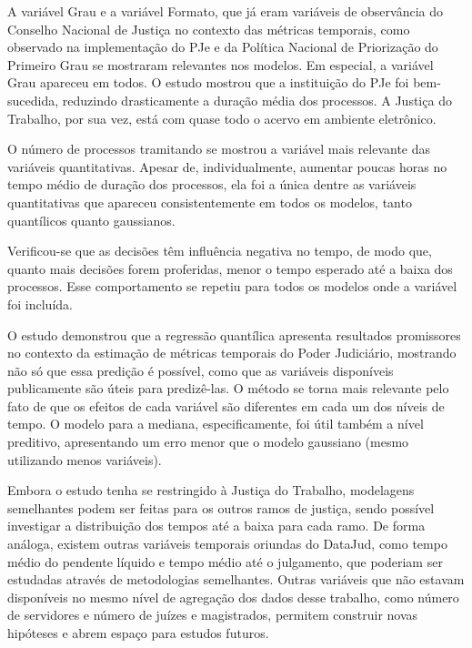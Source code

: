 
A variável Grau e a variável Formato, que já eram variáveis de observância do Conselho Nacional de Justiça no contexto das métricas temporais, como observado na implementação do PJe \cite{pje} e da Política Nacional de Priorização do Primeiro Grau \cite{justicaemnumeros} se mostraram relevantes nos modelos. Em especial, a variável Grau apareceu em todos. O estudo mostrou que a instituição do PJe foi bem-sucedida, reduzindo drasticamente a duração média dos processos. A Justiça do Trabalho, por sua vez, está com quase todo o acervo em ambiente eletrônico. 

O número de processos tramitando se mostrou a variável mais relevante das variáveis quantitativas. Apesar de, individualmente, aumentar poucas horas no tempo médio de duração dos processos, ela foi a única dentre as variáveis quantitativas que apareceu consistentemente em todos os modelos, tanto quantílicos quanto gaussianos.

Verificou-se que as decisões têm influência negativa no tempo, de modo que, quanto mais decisões forem proferidas, menor o tempo esperado até a baixa dos processos. Esse comportamento se repetiu para todos os modelos onde a variável foi incluída. 

O estudo demonstrou que a regressão quantílica apresenta resultados promissores no contexto da estimação de métricas temporais do Poder Judiciário, mostrando não só que essa predição é possível, como que as variáveis disponíveis publicamente são úteis para predizê-las. O método se torna mais relevante pelo fato de que os efeitos de cada variável são diferentes em cada um dos níveis de tempo. O modelo para a mediana, especificamente, foi útil também a nível preditivo, apresentando um erro menor que o modelo gaussiano (mesmo utilizando menos variáveis).

Embora o estudo tenha se restringido à Justiça do Trabalho, modelagens semelhantes podem ser feitas para os outros ramos de justiça, sendo possível investigar a distribuição dos tempos até a baixa para cada ramo. De forma análoga, existem outras variáveis temporais oriundas do DataJud, como tempo médio do pendente líquido e tempo médio até o julgamento, que poderiam ser estudadas através de metodologias semelhantes. Outras variáveis que não estavam disponíveis no mesmo nível de agregação dos dados desse trabalho, como número de servidores e número de juízes e magistrados, permitem construir novas hipóteses e abrem espaço para estudos futuros.
\newpage